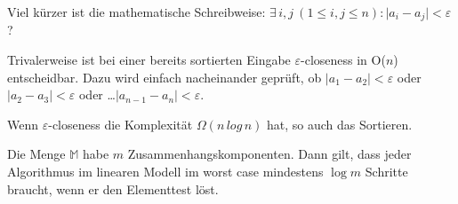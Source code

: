Viel kürzer ist die mathematische Schreibweise: \( \exists \, i,  j \ (1 \leq i, j \leq n):\vert a_i - a_j \vert < \varepsilon \)?

Trivalerweise ist bei einer bereits sortierten Eingabe $\varepsilon$-closeness in O($n$) entscheidbar. Dazu wird einfach nacheinander
geprüft, ob \( \vert a_1 - a_2 \vert < \varepsilon \) oder \( \vert a_2 - a_3 \vert < \varepsilon \) oder \dots \( \vert a_{n-1} -
a_n \vert < \varepsilon \).

\begin{satz} 
Wenn $\varepsilon$-closeness die Komplexität $\Omega (n\, log\, n)$ hat, so auch das Sortieren.
\end{satz}		
		
\begin{satz}
Die Menge  \( \mathbb{M}  \) habe $m$ Zusammenhangskomponenten. Dann gilt, dass jeder Algorithmus im linearen Modell im worst case
mindestens \( \log m \) Schritte braucht, wenn er den Elementtest löst.
\end{satz}
		 	

